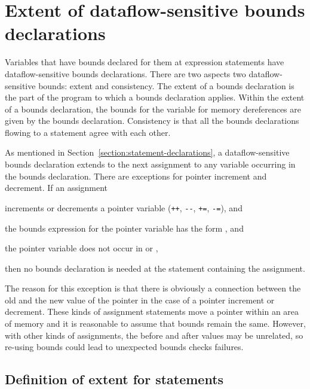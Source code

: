 \section{Extent of dataflow-sensitive bounds declarations}
\label{section:extent-of-declarations}

Variables that have bounds declared for them at expression statements
have dataflow-sensitive bounds declarations. There are two aspects two
dataflow-sensitive bounds: extent and consistency. The extent of a
bounds declaration is the part of the program to which a bounds
declaration applies. Within the extent of a bounds declaration, the
bounds for the variable for memory dereferences are given by the bounds
declaration. Consistency is that all the bounds declarations flowing to
a statement agree with each other.

As mentioned in Section~\ref{section:statement-declarations},
a dataflow-sensitive bounds declaration
extends to the next assignment to any variable occurring in the bounds
declaration. There are exceptions for pointer increment and decrement.
If an assignment

\begin{compactitem}
\item
  increments or decrements a pointer variable (\texttt{++},
  \texttt{-\/-}, \texttt{+=}, \texttt{-=}), and
\item
  the bounds expression for the pointer variable has the form
  , and
\item
  the pointer variable does not occur in  or ,
\end{compactitem}

then no bounds declaration is needed at the statement containing the
assignment.

The reason for this exception is that there is obviously a connection
between the old and the new value of the pointer in the case of a
pointer increment or decrement. These kinds of assignment statements
move a pointer within an area of memory and it is reasonable to assume
that bounds remain the same. However, with other kinds of assignments,
the before and after values may be unrelated, so re-using bounds could
lead to unexpected bounds checks failures.

\subsection{Definition of extent for statements}
\label{section:extent-definition}

